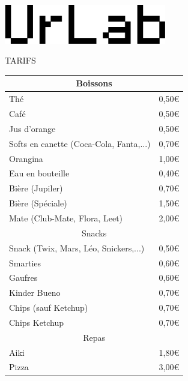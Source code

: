 \documentclass[a4paper]{article}
\begin{document}
    
\begin{center}\includegraphics[width=200pt]{./logo.png}

\Huge TARIFS
\end{center}
\begin{center}
\begin{tabular}{|l|l|}
  \hline

  \multicolumn{2}{|c|}{Boissons} \\
  \hline
  Thé & 0,50\euro \\
  Café & 0,50\euro\\
  Jus d'orange & 0,50\euro\\
  Softs en canette (Coca-Cola, Fanta,...) & 0,70\euro\\
  Orangina & 1,00\euro\\
  Eau en bouteille & 0,40\euro\\
  Bière (Jupiler) & 0,70\euro\\
  Bière (Spéciale) & 1,50\euro\\
  Mate (Club-Mate, Flora, Leet) & 2,00\euro\\
  \hline

  \multicolumn{2}{|c|}{Snacks} \\
  \hline
  Snack (Twix, Mars, Léo, Snickers,...) & 0,50\euro\\
  Smarties & 0,60\euro\\
  Gaufres & 0,60\euro\\
  Kinder Bueno & 0,70\euro\\
  Chips (sauf Ketchup) & 0,70\euro\\
  Chips Ketchup & 0,70\euro\\
  \hline

  \multicolumn{2}{|c|}{Repas} \\
  \hline
  Aiki & 1,80\euro\\
  Pizza & 3,00\euro\\
  \hline
\end{tabular}
\end{center}
\end{document}
